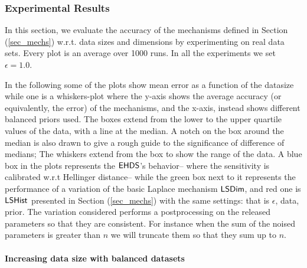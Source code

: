 \documentclass{article}
\begin{document}
\subsubsection{Experimental Results}
\label{subsec_vs_variables}

In this section, we evaluate the accuracy of the mechanisms defined in
Section (\ref{sec_mechs}) w.r.t. data sizes and dimensions by experimenting on real data sets.
Every plot is an average over 1000 runs. In all the experiments we set
$\epsilon = 1.0$.

\noindent In the following some of the plots show
mean error as a function of the datasize while one
is a whiskers-plot where the y-axis shows the average
accuracy (or equivalently, the error) of the mechanisms, and the x-axis, instead shows
different balanced priors used. The boxes extend from the lower to the upper quartile values
of the data, with a line at the median. A notch on the box around the
median is also drawn to give a rough guide to the significance of
difference of medians; The whiskers extend from the box to show the
range of the data. A blue box in the plots represents the $\mathsf{EHDS}$'s behavior-- where the sensitivity is calibrated
w.r.t Hellinger distance-- while the green box next to
it represents the performance of a variation of the basic Laplace
mechanism $\mathsf{LSDim}$, and red one is $\mathsf{LSHist}$ presented in Section (\ref{sec_mechs}) with the same
settings: that is $\epsilon$, data, prior. The variation
considered performs a postprocessing on the released parameters so
that they are consistent. For instance when the sum of the noised
parameters is greater than $n$ we will truncate them so that they sum
up to $n$.

\paragraph{Increasing data size with balanced datasets}
\label{subsubsec_vs_datasize}


\begin{figure}[ht]
\begin{center}
\centering
{}

\end{center}
\end{figure}
\end{document}
